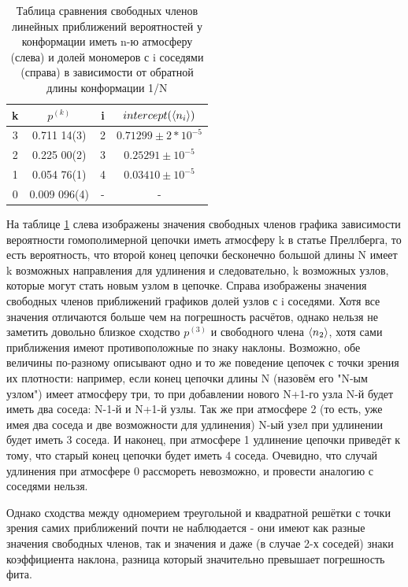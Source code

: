 \begin{table}[]
    \centering
    \begin{tabular}{|c|c|c|c|}
    \hline
    k & $p^{(k)}$ & i & $intercept(\langle n_{i} \rangle)$ \\ \hline
    3 & 0.711 14(3) & 2 & $0.71299 \pm 2*10^{-5}$ \\ \hline
    2 & 0.225 00(2) & 3 & $0.25291 \pm 10^{-5}$ \\ \hline
    1 & 0.054 76(1) & 4 & $0.03410 \pm 10^{-5}$\\ \hline
    0 & 0.009 096(4) & - & - \\ \hline
    \end{tabular}
    \caption{Таблица сравнения свободных членов линейных приближений вероятностей у конформации иметь n-ю атмосферу (слева) и долей мономеров с i соседями (справа) в зависимости от обратной длины конформации 1/N}
    \label{tab:Prellb_Compare}
\end{table}

На таблице \ref{tab:Prellb_Compare} слева изображены значения свободных членов графика зависимости вероятности гомополимерной цепочки иметь атмосферу k в статье Преллберга\cite{Prellberg}, то есть вероятность, что второй конец цепочки бесконечно большой длины N имеет k возможных направления для удлинения и следовательно, k возможных узлов, которые могут стать новым узлом в цепочке. Справа изображены значения свободных членов приближений графиков долей узлов с i соседями. Хотя все значения отличаются больше чем на погрешность расчётов, однако нельзя не заметить довольно близкое сходство $p^{(3)}$ и свободного члена $\langle n_{2} \rangle$, хотя сами приближения имеют противоположные по знаку наклоны. 
Возможно, обе величины по-разному описывают одно и то же поведение цепочек с точки зрения их плотности: например, если конец цепочки длины N (назовём его "N-ым узлом") имеет атмосферу три, то при добавлении нового N+1-го узла N-й будет иметь два соседа: N-1-й и N+1-й узлы. Так же при атмосфере 2 (то есть, уже имея два соседа и две возможности для удлинения) N-ый узел при удлинении будет иметь 3 соседа. И наконец, при атмосфере 1 удлинение цепочки приведёт к тому, что старый конец цепочки будет иметь 4 соседа. Очевидно, что случай удлинения при атмосфере 0 рассмореть невозможно, и провести аналогию с соседями нельзя.

Однако сходства между одномерием треугольной и квадратной решётки с точки зрения самих приближений почти не наблюдается - они имеют как разные значения свободных членов, так и значения и даже (в случае 2-х соседей) знаки коэффициента наклона, разница который значительно превышает погрешность фита.



